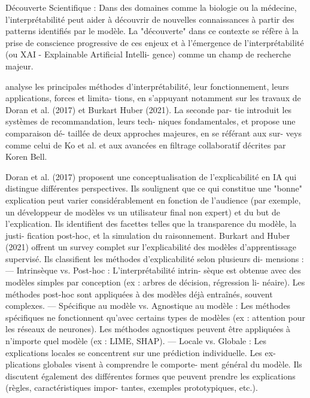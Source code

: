  Découverte Scientifique : Dans des domaines
comme la biologie ou la médecine, l’interprétabilité
peut aider à découvrir de nouvelles connaissances à
partir des patterns identifiés par le modèle.
La "découverte" dans ce contexte se réfère à la prise de
conscience progressive de ces enjeux et à l’émergence de
l’interprétabilité (ou XAI - Explainable Artificial Intelli-
gence) comme un champ de recherche majeur.


analyse les principales méthodes d’interprétabilité,
leur fonctionnement, leurs applications, forces et limita-
tions, en s’appuyant notamment sur les travaux de Doran
et al. (2017) et Burkart Huber (2021). La seconde par-
tie introduit les systèmes de recommandation, leurs tech-
niques fondamentales, et propose une comparaison dé-
taillée de deux approches majeures, en se référant aux sur-
veys comme celui de Ko et al. et aux avancées en filtrage
collaboratif décrites par Koren Bell.


Doran et al. (2017) proposent une conceptualisation de
l’explicabilité en IA qui distingue différentes perspectives.
Ils soulignent que ce qui constitue une "bonne" explication
peut varier considérablement en fonction de l’audience
(par exemple, un développeur de modèles vs un utilisateur
final non expert) et du but de l’explication. Ils identifient
des facettes telles que la transparence du modèle, la justi-
fication post-hoc, et la simulation du raisonnement.
Burkart and Huber (2021) offrent un survey complet sur
l’explicabilité des modèles d’apprentissage supervisé. Ils
classifient les méthodes d’explicabilité selon plusieurs di-
mensions :
— Intrinsèque vs. Post-hoc : L’interprétabilité intrin-
sèque est obtenue avec des modèles simples par
conception (ex : arbres de décision, régression li-
néaire). Les méthodes post-hoc sont appliquées à des
modèles déjà entraînés, souvent complexes.
— Spécifique au modèle vs. Agnostique au modèle :
Les méthodes spécifiques ne fonctionnent qu’avec
certains types de modèles (ex : attention pour les
réseaux de neurones). Les méthodes agnostiques
peuvent être appliquées à n’importe quel modèle (ex :
LIME, SHAP).
— Locale vs. Globale : Les explications locales se
concentrent sur une prédiction individuelle. Les ex-
plications globales visent à comprendre le comporte-
ment général du modèle.
Ils discutent également des différentes formes que peuvent
prendre les explications (règles, caractéristiques impor-
tantes, exemples prototypiques, etc.).